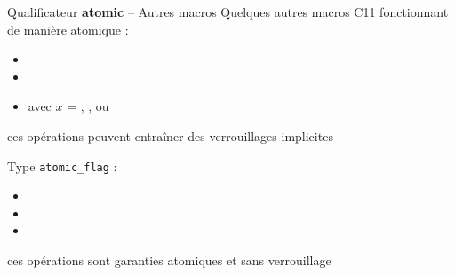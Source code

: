 \begin {frame} {Qualificateur \textbf {atomic} -- Autres macros}
    Quelques autres macros C11 fonctionnant de manière atomique :

    {\fC
    \begin {itemize}
	\item {}
	\item {}
	\item {} avec $x$ = ,
		    ,  ou 
    \end {itemize}
    }

    \implique ces opérations peuvent entraîner des verrouillages
    implicites

    \vspace* {3mm}

    Type \texttt {atomic\_flag} :

    {\fC
    \begin {itemize}
	\item {}
	\item {}
	\item {}
    \end {itemize}
    }

    \implique ces opérations sont garanties atomiques et sans verrouillage
\end {frame}

